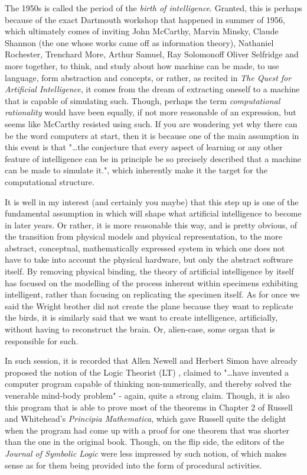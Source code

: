 The 1950s is called the period of the \textit{birth of intelligence}. Granted, this is perhaps because of the exact Dartmouth workshop that happened in summer of 1956, which ultimately comes of inviting John McCarthy, Marvin Minsky, Claude Shannon (the one whose works came off as information theory), Nathaniel Rochester, Trenchard More, Arthur Samuel, Ray Solomonoff Oliver Selfridge and more together, to think, and study about how machine can be made, to use language, form abstraction and concepts, or rather, as recited in \textit{The Quest for Artificial Intelligence}, it comes from the dream of extracting oneself to a machine that is capable of simulating such. Though, perhaps the term \textit{computational rationality} would have been equally, if not more reasonable of an expression, but seems like McCarthy resisted using such. If you are wondering yet why there can be the word computers at start, then it is because one of the main assumption in this event is that "\dots the conjecture that every aspect of learning or any other feature of intelligence can be in principle be so precisely described that a machine can be made to simulate it.", which inherently make it the target for the computational structure.  

It is well in my interest (and certainly you maybe) that this step up is one of the fundamental assumption in which will shape what artificial intelligence to become in later years. Or rather, it is more reasonable this way, and is pretty obvious, of the transition from physical models and physical representation, to the more abstract, conceptual, mathematically expressed system in which one does not have to take into account the physical hardware, but only the abstract software itself. By removing physical binding, the theory of artificial intelligence by itself has focused on the modelling of the process inherent within specimens exhibiting intelligent, rather than focusing on replicating the specimen itself. As for once we said the Wright brother did not create the plane because they want to replicate the birds, it is similarly said that we want to create intelligence, artificially, without having to reconstruct the brain. Or, alien-case, some organ that is responsible for such. 

In such session, it is recorded that Allen Newell and Herbert Simon have already proposed the notion of the Logic Theorist (LT) \cite{1056797NewellSimon}, claimed to "\dots have invented a computer program capable of thinking non-numerically, and thereby solved the venerable mind-body problem" - again, quite a strong claim. Though, it is also this program that is able to prove most of the theorems in Chapter 2 of Russell and Whitehead's \textit{Principia Mathematica}, which gave Russell quite the delight when the program had come up with a proof for one theorem that was shorter than the one in the original book. Though, on the flip side, the editors of the \textit{Journal of Symbolic Logic} were less impressed by such notion, of which makes sense as for them being provided into the form of procedural activities. 

